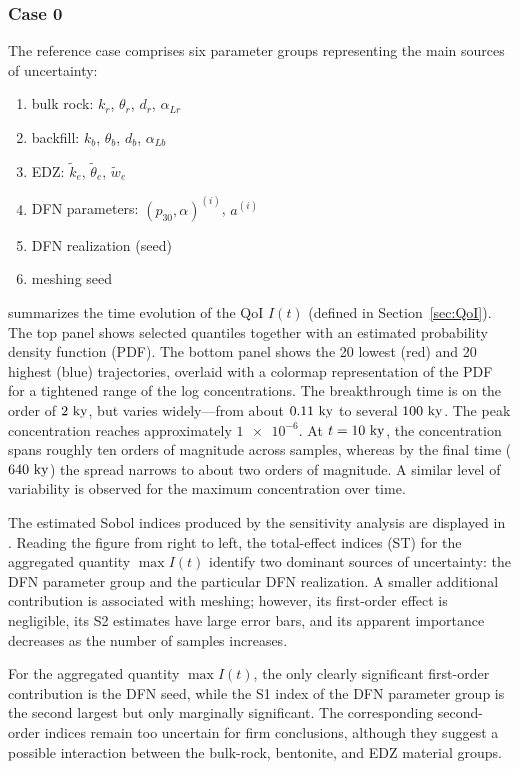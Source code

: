 \FloatBarrier
\subsubsection{Case 0}
The reference case comprises six parameter groups representing the main sources
of uncertainty:
\begin{enumerate}
    \item bulk rock: $k_r$, $\theta_r$, $d_r$, $\alpha_{Lr}$
    \item backfill: $k_b$, $\theta_b$, $d_b$, $\alpha_{Lb}$
    \item EDZ: $\tilde k_e$, $\tilde \theta_e$, $\tilde w_e$
    \item DFN parameters: $(p_{30}, \alpha)^{(i)}$, $a^{(i)}$
    \item DFN realization (seed)
    \item meshing seed
\end{enumerate}

 summarizes the time evolution of the \gls{QoI}
$I(t)$ (defined in Section~\ref{sec:QoI}). The top panel shows selected
quantiles together with an estimated probability density function (PDF). The
bottom panel shows the 20 lowest (red) and 20 highest (blue) trajectories,
overlaid with a colormap representation of the PDF for a tightened range of the
log concentrations. The breakthrough time is on the order of $2\,\,\mathrm{ky}$,
but varies widely—from about $0.11\,\,\mathrm{ky}$ to several $100\,\,\mathrm{ky}$.
The peak concentration reaches approximately $\num{1e-6}$. At
$t=10\,\,\mathrm{ky}$, the concentration spans roughly ten orders of magnitude
across samples, whereas by the final time ($640\,\,\mathrm{ky}$) the spread
narrows to about two orders of magnitude. A similar level of variability is
observed for the maximum concentration over time.

The estimated Sobol indices produced by the sensitivity analysis are displayed
in .
Reading the figure from right to left, the total-effect indices (ST) for the
aggregated quantity $\max I(t)$ identify two dominant sources of uncertainty:
the \gls{DFN} parameter group and the particular \gls{DFN} realization.
A smaller additional contribution is associated with meshing; however, its
first-order effect is negligible, its S2 estimates have large error bars, and
its apparent importance decreases as the number of samples increases.

For the aggregated quantity $\max I(t)$, the only clearly significant
first-order contribution is the \gls{DFN} seed, while the S1 index of the
\gls{DFN} parameter group is the second largest but only marginally
significant. The corresponding second-order indices remain too uncertain for
firm conclusions, although they suggest a possible interaction between the
bulk-rock, bentonite, and \gls{EDZ} material groups.

